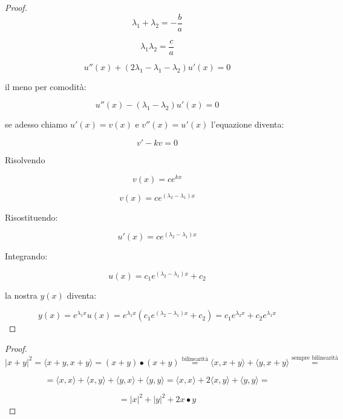 \documentclass[11pt]{article}
\begin{document}
\begin{proof}
        \[
            \lambda_1 + \lambda_2 = -\frac{b}{a}
        \]

        \[
            \lambda_1  \lambda_2 = \frac{c}{a}
        \]

        \[
            u''(x) + (2 \lambda_1 - \lambda_1 - \lambda_2)u'(x) = 0
        \]

        il meno per comodità:

        \[
            u''(x) - (\lambda_1 - \lambda_2)u'(x) = 0
        \]

        se adesso chiamo $u'(x)=v(x)$ e $v''(x) = u'(x)$ l'equazione diventa:

        \[
            v' -kv = 0
        \]

        Risolvendo 

        \[
            v(x) = ce ^{kx}
        \]

        \[
            v(x) = c e^{(\lambda_2 - \lambda_1)x}
        \]

        Risostituendo:

        \[
            u'(x) = c e ^{(\lambda_2- \lambda_1)x}
        \]

        Integrando:

        \[
            u(x)  = c_1 e ^{(\lambda_2 - \lambda_1)x}+c_2
        \]
        
        la nostra $y(x)$ diventa:

        \[
            y(x) = e ^{\lambda_1 x}u(x) = e ^{\lambda_1 x}( c_1 e ^{(\lambda_2 - \lambda_1)x}+c_2) = c_1 e ^{\lambda_2 x}+ c_2 e ^{\lambda_1 x}
        \]


\end{proof}
\newpage
\begin{proof}
       \[
           |x+ y| ^{2} = \langle x+y , x+y \rangle = (x+y) \bullet (x+y) \overset{\text{bilinearità}}{=} \langle x,x+y \rangle + \langle y,x+y \rangle \overset{\text{sempre bilinearità}}{=} 
       \]    

       \[
           =\langle x,x \rangle + \langle x,y \rangle + \langle y,x \rangle + \langle y,y \rangle = \langle x,x \rangle + 2\langle x,y \rangle + \langle y,y \rangle= 
       \]

       \[
            = |x|^{2} + |y|^{2} + 2x \bullet y
       \]
\end{proof}
\newpage
\end{document}
